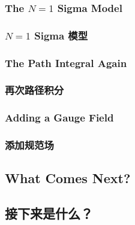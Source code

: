 \documentclass{article}
\begin{document}
\begin{paracol}{2}
\subsubsection{The $N = 1$ Sigma Model}
\switchcolumn
\subsubsection*{$N = 1$ Sigma 模型}
\switchcolumn*

\subsubsection{The Path Integral Again}
\switchcolumn
\subsubsection*{再次路径积分}
\switchcolumn*

\subsubsection{Adding a Gauge Field}
\switchcolumn
\subsubsection*{添加规范场}
\switchcolumn*

\subsection{What Comes Next?}
\switchcolumn
\subsection*{接下来是什么？}
\switchcolumn*
\end{paracol}
\end{document}
